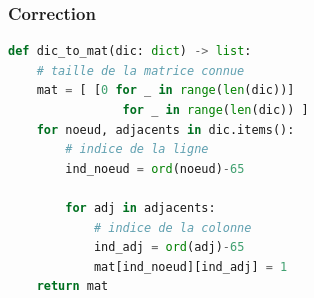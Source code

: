 \documentclass[svgnames,11pt]{beamer}
\begin{document}
\begin{frame}[fragile]
    \frametitle{Correction}

\begin{center}
\begin{lstlisting}[language=Python , basicstyle=\ttfamily\small, xleftmargin=2em, xrightmargin=2em]
def dic_to_mat(dic: dict) -> list:
    # taille de la matrice connue
    mat = [ [0 for _ in range(len(dic))] 
                for _ in range(len(dic)) ]
    for noeud, adjacents in dic.items():
        # indice de la ligne
        ind_noeud = ord(noeud)-65

        for adj in adjacents:
            # indice de la colonne
            ind_adj = ord(adj)-65
            mat[ind_noeud][ind_adj] = 1
    return mat
\end{lstlisting}
\end{center}

\end{frame}
\end{document}
